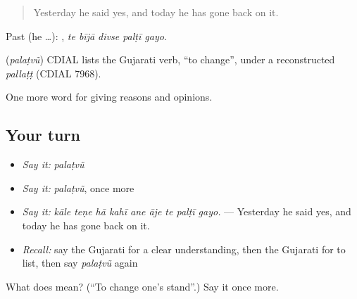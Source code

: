 \begin{quote}
Yesterday he said yes, and today he has gone back on it.
\end{quote}

Past (he …):     , \emph{te bījā divse palṭī gayo}.

\begin{cousinweb}
\textbf{} (\emph{palaṭvũ}) CDIAL lists the Gujarati verb, \textquotedblleft{}to change\textquotedblright{}, under a reconstructed \emph{pallaṭṭ} (CDIAL 7968).
\end{cousinweb}

\begin{grammarlens}[title={What you've built}]
One more word for giving reasons and opinions.
\end{grammarlens}

\subsection*{Your turn}
\begin{itemize}
\raggedright
  \item \emph{Say it:} \emph{palaṭvũ}
  \item \emph{Say it:} \emph{palaṭvũ}, once more
  \item \emph{Say it:} \emph{kāle teṇe hā kahī ane āje te palṭī gayo.} — Yesterday he said yes, and today he has gone back on it.
  \item \emph{Recall:} say the Gujarati for a clear understanding, then the Gujarati for to list, then say \emph{palaṭvũ} again
\end{itemize}

\begin{tcolorbox}[breakable,colback=teal!4,colframe=teal!35!black,title={Before you move on}]
What does  mean? (\textquotedblleft{}To change one's stand\textquotedblright{}.) Say it once more.
\end{tcolorbox}
